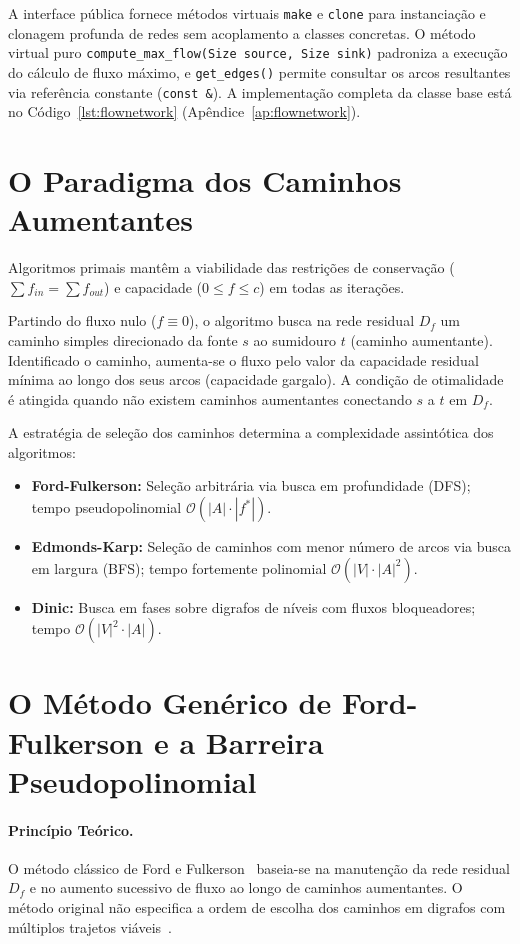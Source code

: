 A interface pública fornece métodos virtuais \lstinline{make} e \lstinline{clone} para instanciação e clonagem profunda de redes sem acoplamento a classes concretas. O método virtual puro \lstinline{compute_max_flow(Size source, Size sink)} padroniza a execução do cálculo de fluxo máximo, e \lstinline{get_edges()} permite consultar os arcos resultantes via referência constante (\lstinline{const &}). A implementação completa da classe base está no Código~\ref{lst:flownetwork} (Apêndice~\ref{ap:flownetwork}).


\section{O Paradigma dos Caminhos Aumentantes}
\label{sec:fluxo_primal}

Algoritmos primais mantêm a viabilidade das restrições de conservação ($\sum f_{in} = \sum f_{out}$) e capacidade ($0 \le f \le c$) em todas as iterações.

Partindo do fluxo nulo ($f \equiv 0$), o algoritmo busca na rede residual $D_f$ um caminho simples direcionado da fonte $s$ ao sumidouro $t$ (caminho aumentante). Identificado o caminho, aumenta-se o fluxo pelo valor da capacidade residual mínima ao longo dos seus arcos (capacidade gargalo). A condição de otimalidade é atingida quando não existem caminhos aumentantes conectando $s$ a $t$ em $D_f$.

A estratégia de seleção dos caminhos determina a complexidade assintótica dos algoritmos:
\begin{itemize}
    \item \textbf{Ford-Fulkerson:} Seleção arbitrária via busca em profundidade (DFS); tempo pseudopolinomial $\mathcal{O}(|A| \cdot |f^*|)$.
    \item \textbf{Edmonds-Karp:} Seleção de caminhos com menor número de arcos via busca em largura (BFS); tempo fortemente polinomial $\mathcal{O}(|V| \cdot |A|^2)$.
    \item \textbf{Dinic:} Busca em fases sobre digrafos de níveis com fluxos bloqueadores; tempo $\mathcal{O}(|V|^2 \cdot |A|)$.
\end{itemize}


\section{O Método Genérico de Ford-Fulkerson e a Barreira Pseudopolinomial}\label{sec:ford_fulkerson}

\paragraph{Princípio Teórico.}
O método clássico de Ford e Fulkerson~\cite{ford1956maximal} baseia-se na manutenção da rede residual $D_f$ e no aumento sucessivo de fluxo ao longo de caminhos aumentantes. O método original não especifica a ordem de escolha dos caminhos em digrafos com múltiplos trajetos viáveis~\cite{ahuja1993network}.

